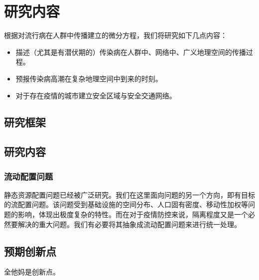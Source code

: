 \chapter{研究内容}

根据对流行病在人群中传播建立的微分方程，我们将研究如下几点内容：

\begin{itemize}
    \item 描述（尤其是有潜伏期的）传染病在人群中、网络中、广义地理空间的传播过程。
    \item 预报传染病高潮在复杂地理空间中到来的时刻。
    \item 对于存在疫情的城市建立安全区域与安全交通网络。
\end{itemize}

\section{研究框架}



\section{研究内容}

\subsection{流动配置问题}

静态资源配置问题已经被广泛研究。我们在这里面向问题的另一个方向，即有目标的流配置问题。该问题受到基础设施的空间分布、人口固有密度、移动性加权等问题的影响，体现出极度复杂的特性。而在对于疫情防控来说，隔离程度又是一个必然要解决的重大问题。我们有必要将其抽象成流动配置问题来进行统一处理。

\section{预期创新点}
全他妈是创新点。